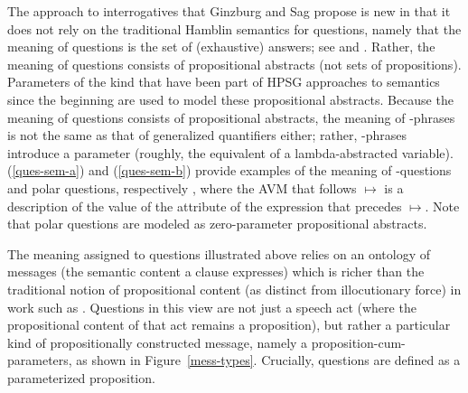 \documentclass[output=paper
	        ,collection
	        ,collectionchapter
 	        ,biblatex
                ,babelshorthands
                ,newtxmath
                ,draftmode
                ,colorlinks, citecolor=brown
]{langscibook}
\begin{document}
The approach to interrogatives that Ginzburg and Sag propose is new in that it does not rely on the traditional Hamblin semantics for questions, namely that the meaning of questions is the set of (exhaustive) answers; see \citet{Hamblin1973} and \citet{GroenendijkandStokhoff1997}. Rather, the meaning of questions consists of propositional abstracts (not sets of propositions). Parameters of the kind that have been part of HPSG approaches to semantics since the beginning are used to model these propositional abstracts. Because the meaning of questions consists of propositional abstracts, the meaning of  -phrases is not the same as that of generalized quantifiers either; rather, -phrases introduce a parameter (roughly, the equivalent of a lambda-abstracted variable). (\ref{ques-sem-a}) and (\ref{ques-sem-b}) provide examples of the meaning of -questions and polar questions, respectively \citep[137]{GinzburgandSag2001}, where the AVM that follows $\mapsto$ is a description of the value of the  attribute of the expression that precedes $\mapsto$. Note that polar questions are modeled as zero-parameter propositional abstracts.

\begin{exe}
\ex\label{ques-sem-a}
\ex\label{ques-sem-b}

\end{exe}


The meaning assigned to questions illustrated above relies on an ontology of messages (the semantic content a clause expresses) which is richer than the traditional notion of propositional content (as distinct from illocutionary force) in work such as \citet{Searle1969}. Questions in this view are not just a speech act (where the propositional content of that act remains a proposition), but rather a particular kind of propositionally constructed message, namely a proposition-cum-parameters, as shown in Figure~\ref{mess-types}. Crucially, questions are defined as a parameterized proposition.
\end{document}
